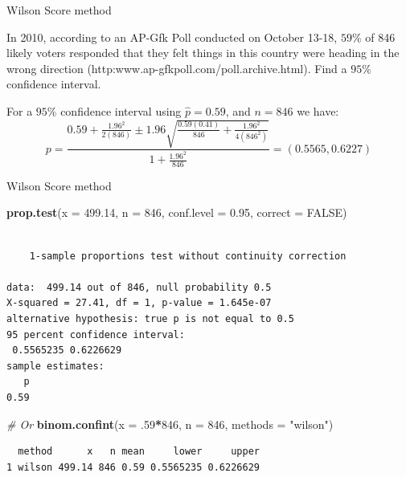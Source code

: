 \documentclass[
  ignorenonframetext,
]{beamer}
\newenvironment{Shaded}{\begin{snugshade}}{\end{snugshade}}
\newcommand{\AttributeTok}[1]{\textcolor[rgb]{0.13,0.29,0.53}{#1}}
\newcommand{\CommentTok}[1]{\textcolor[rgb]{0.56,0.35,0.01}{\textit{#1}}}
\newcommand{\ConstantTok}[1]{\textcolor[rgb]{0.56,0.35,0.01}{#1}}
\newcommand{\DecValTok}[1]{\textcolor[rgb]{0.00,0.00,0.81}{#1}}
\newcommand{\FloatTok}[1]{\textcolor[rgb]{0.00,0.00,0.81}{#1}}
\newcommand{\FunctionTok}[1]{\textcolor[rgb]{0.13,0.29,0.53}{\textbf{#1}}}
\newcommand{\NormalTok}[1]{#1}
\newcommand{\SpecialCharTok}[1]{\textcolor[rgb]{0.81,0.36,0.00}{\textbf{#1}}}
\newcommand{\StringTok}[1]{\textcolor[rgb]{0.31,0.60,0.02}{#1}}
\begin{document}
\begin{frame}{Wilson Score method}
\label{wilson-score-method-1}
\begin{tcolorbox}
In 2010, according to an AP-Gfk Poll conducted on October 13-18, $59\%$ of 846 likely voters responded that they felt things in this country were heading in the wrong direction (http:www.ap-gfkpoll.com/poll.archive.html). Find a $95\%$ confidence interval. 
\end{tcolorbox}

\begin{tcolorbox}
For a $95\%$ confidence interval using $\hat{p}=0.59$, and $n=846$ we have:
$$p=\frac{0.59+\frac{1.96^2}{2(846)}\pm 1.96\sqrt{\frac{0.59(0.41)}{846}+\frac{1.96^2}{4(846^2)}}}{1+\frac{1.96^2}{846}}=(0.5565,0.6227)$$
\end{tcolorbox}
\end{frame}

\begin{frame}[fragile]{Wilson Score method}
\label{wilson-score-method-2}
\tiny

\begin{Shaded}
\begin{Highlighting}[]
\FunctionTok{prop.test}\NormalTok{(}\AttributeTok{x =} \FloatTok{499.14}\NormalTok{, }\AttributeTok{n =} \DecValTok{846}\NormalTok{, }\AttributeTok{conf.level =} \FloatTok{0.95}\NormalTok{, }\AttributeTok{correct =} \ConstantTok{FALSE}\NormalTok{)}
\end{Highlighting}
\end{Shaded}

\begin{verbatim}

    1-sample proportions test without continuity correction

data:  499.14 out of 846, null probability 0.5
X-squared = 27.41, df = 1, p-value = 1.645e-07
alternative hypothesis: true p is not equal to 0.5
95 percent confidence interval:
 0.5565235 0.6226629
sample estimates:
   p 
0.59 
\end{verbatim}

\begin{Shaded}
\begin{Highlighting}[]
\CommentTok{\# Or}
\FunctionTok{binom.confint}\NormalTok{(}\AttributeTok{x =}\NormalTok{ .}\DecValTok{59}\SpecialCharTok{*}\DecValTok{846}\NormalTok{, }\AttributeTok{n =} \DecValTok{846}\NormalTok{, }\AttributeTok{methods =} \StringTok{"wilson"}\NormalTok{)}
\end{Highlighting}
\end{Shaded}

\begin{verbatim}
  method      x   n mean     lower     upper
1 wilson 499.14 846 0.59 0.5565235 0.6226629
\end{verbatim}

\normalsize
\end{frame}
\end{document}
